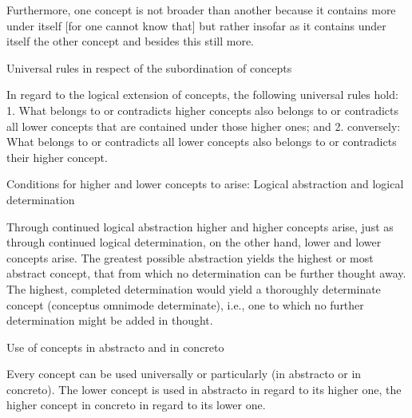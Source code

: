 Furthermore, one concept is not broader than another
because it contains more under itself
[for one cannot know that]
but rather insofar as it contains under itself
the other concept and besides this still more.

Universal rules in respect of the subordination of concepts

In regard to the logical extension of concepts,
the following universal rules hold:
1. What belongs to or contradicts higher concepts
also belongs to or contradicts all lower concepts
that are contained under those higher ones; and
2. conversely: What belongs to or contradicts all lower concepts
also belongs to or contradicts their higher concept.

Conditions for higher and lower concepts to arise:
Logical abstraction and logical determination

Through continued logical abstraction
higher and higher concepts arise,
just as through continued logical determination,
on the other hand,
lower and lower concepts arise.
The greatest possible abstraction yields
the highest or most abstract concept,
that from which no determination can be further thought away.
The highest, completed determination would yield
a thoroughly determinate concept
(conceptus omnimode determinate),
i.e., one to which no further determination might be added in thought.

Use of concepts in abstracto and in concreto

Every concept can be used universally or particularly
(in abstracto or in concreto).
The lower concept is used in abstracto in regard to its higher one,
the higher concept in concreto in regard to its lower one.
